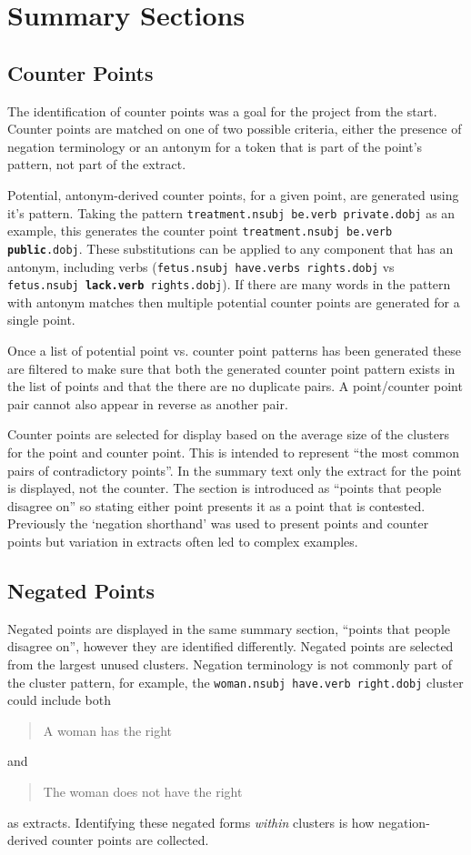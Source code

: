   \section{Summary Sections}
    \subsection{Counter Points}
      The identification of counter points was a goal for the project from the start. Counter points are matched on one of two possible criteria, either the presence of negation terminology or an antonym for a token that is part of the point's pattern, not part of the extract.

      Potential, antonym-derived counter points, for a given point, are generated using it's pattern. Taking the pattern \texttt{treatment.nsubj be.verb private.dobj} as an example, this generates the counter point \texttt{treatment.nsubj be.verb \textbf{public}.dobj}. These substitutions can be applied to any component that has an antonym, including verbs (\texttt{fetus.nsubj have.verbs rights.dobj} vs \texttt{fetus.nsubj \textbf{lack.verb} rights.dobj}). If there are many words in the pattern with antonym matches then multiple potential counter points are generated for a single point.

      Once a list of potential point vs. counter point patterns has been generated these are filtered to make sure that both the generated counter point pattern exists in the list of points and that the there are no duplicate pairs. A point/counter point pair cannot also appear in reverse as another pair.

      Counter points are selected for display based on the average size of the clusters for the point and counter point. This is intended to represent ``the most common pairs of contradictory points''. In the summary text only the extract for the point is displayed, not the counter. The section is introduced as ``points that people disagree on'' so stating either point presents it as a point that is contested. Previously the `negation shorthand' was used to present points and counter points but variation in extracts often led to complex examples.

    \subsection{Negated Points}
    Negated points are displayed in the same summary section, ``points that people disagree on'', however they are identified differently. Negated points are selected from the largest unused clusters. Negation terminology is not commonly part of the cluster pattern, for example, the \texttt{woman.nsubj have.verb right.dobj} cluster could include both \blockquote{A woman has the right} and \blockquote{The woman does not have the right} as extracts. Identifying these negated forms \textit{within} clusters is how negation-derived counter points are collected.

